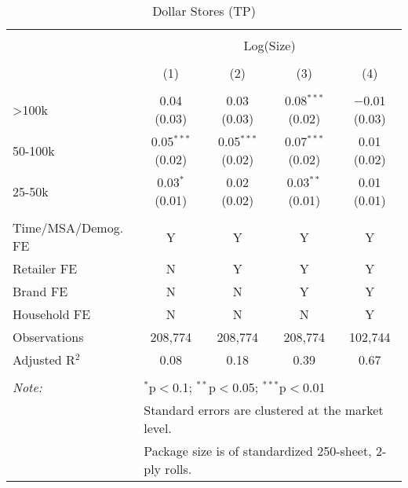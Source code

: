 
\begin{table}[!htbp] \centering 
  \caption{Dollar Stores (TP)} 
  \label{tab:packageSizeDollar} 
\begin{tabular}{@{\extracolsep{5pt}}lcccc} 
\\[-1.8ex]\hline 
\hline \\[-1.8ex] 
 & \multicolumn{4}{c}{Log(Size)} \\ 
\\[-1.8ex] & (1) & (2) & (3) & (4)\\ 
\hline \\[-1.8ex] 
 >100k & 0.04 (0.03) & 0.03 (0.03) & 0.08$^{***}$ (0.02) & $-$0.01 (0.03) \\ 
  50-100k & 0.05$^{***}$ (0.02) & 0.05$^{***}$ (0.02) & 0.07$^{***}$ (0.02) & 0.01 (0.02) \\ 
  25-50k & 0.03$^{*}$ (0.01) & 0.02 (0.02) & 0.03$^{**}$ (0.01) & 0.01 (0.01) \\ 
 \hline \\[-1.8ex] 
Time/MSA/Demog. FE & Y & Y & Y & Y \\ 
Retailer FE & N & Y & Y & Y \\ 
Brand FE & N & N & Y & Y \\ 
Household FE & N & N & N & Y \\ 
Observations & 208,774 & 208,774 & 208,774 & 102,744 \\ 
Adjusted R$^{2}$ & 0.08 & 0.18 & 0.39 & 0.67 \\ 
\hline 
\hline \\[-1.8ex] 
\textit{Note:}  & \multicolumn{4}{l}{$^{*}$p$<$0.1; $^{**}$p$<$0.05; $^{***}$p$<$0.01} \\ 
 & \multicolumn{4}{l}{Standard errors are clustered at the market level.} \\ 
 & \multicolumn{4}{l}{Package size is of standardized 250-sheet, 2-ply rolls.} \\ 
\end{tabular} 
\end{table} 
